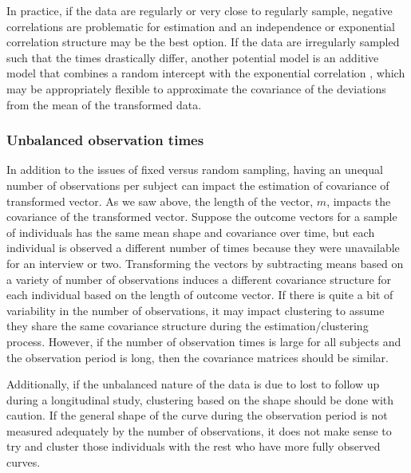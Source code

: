 In practice, if the data are regularly or very close to regularly sample, negative correlations are problematic for estimation and an independence or exponential correlation structure may be the best option. If the data are irregularly sampled such that the times drastically differ, another potential model is an additive model that combines a random intercept with the exponential correlation \cite{diggle2002}, which may be appropriately flexible to approximate the covariance of the deviations from the mean of the transformed data.

\subsubsection{Unbalanced observation times}
In addition to the issues of fixed versus random sampling, having an unequal number of observations per subject can impact the estimation of covariance of transformed vector. As we saw above, the length of the vector, $m$, impacts the covariance of the transformed vector. Suppose the outcome vectors for a sample of individuals has the same mean shape and covariance over time, but each individual is observed a different number of times because they were unavailable for an interview or two. Transforming the vectors by subtracting means based on a variety of number of observations induces a different covariance structure for each individual based on the length of outcome vector. If there is quite a bit of variability in the number of observations, it may impact clustering to assume they share the same covariance structure during the estimation/clustering process. However, if the number of observation times is large for all subjects and the observation period is long, then the covariance matrices should be similar. 

Additionally, if the unbalanced nature of the data is due to lost to follow up during a longitudinal study, clustering based on the shape should be done with caution. If the general shape of the curve during the observation period is not measured adequately by the number of observations, it does not make sense to try and cluster those individuals with the rest who have more fully observed curves. 


